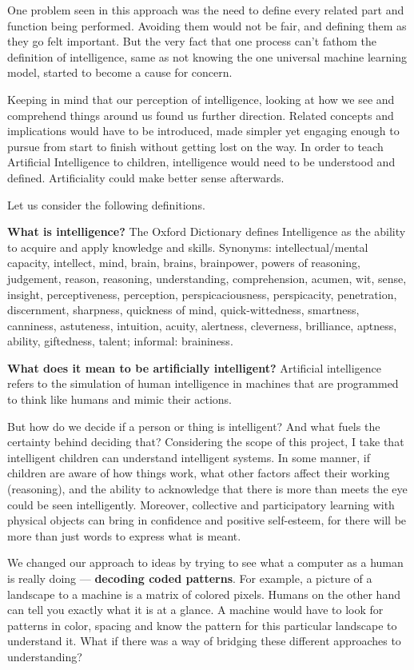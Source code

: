 \documentclass	[a4paper,11pt, hidelinks]{article}
\theoremstyle{definition}
\begin{document}
One problem seen in this approach was the need to define every related part and function being performed.  Avoiding them would not be fair, and defining them as they go felt important. But the very fact that one process can’t fathom the definition of intelligence, same as not knowing the one universal machine learning model, started to become a cause for concern. 

Keeping in mind that our perception of intelligence, looking at how we see and comprehend things around us found us further direction. Related concepts and implications would have to be introduced, made simpler yet engaging enough to pursue from start to finish without getting lost on the way. In order to teach Artificial Intelligence to children, intelligence would need to be understood and defined. Artificiality could make better sense afterwards.

Let us consider the following definitions. 

\textbf{What is intelligence?} The Oxford Dictionary defines Intelligence as the ability to acquire and apply knowledge and skills. Synonyms: intellectual/mental capacity, intellect, mind, brain, brains, brainpower, powers of reasoning, judgement, reason, reasoning, understanding, comprehension, acumen, wit, sense, insight, perceptiveness, perception, perspicaciousness, perspicacity, penetration, discernment, sharpness, quickness of mind, quick-wittedness, smartness, canniness, astuteness, intuition, acuity, alertness, cleverness, brilliance, aptness, ability, giftedness, talent; informal: braininess.

\textbf{What does it mean to be artificially intelligent?} Artificial intelligence refers to the simulation of human intelligence in machines that are programmed to think like humans and mimic their actions. 

But how do we decide if a person or thing is intelligent? And what fuels the certainty behind deciding that? Considering the scope of this project, I take that intelligent children can understand intelligent systems. In some manner, if children are aware of how things work, what other factors affect their working (reasoning), and the ability to acknowledge that there is more than meets the eye could be seen intelligently. Moreover, collective and participatory learning with physical objects can bring in confidence and positive self-esteem, for there will be more than just words to express what is meant.

We changed our approach to ideas by trying to see what a computer as a human is really doing — \textbf{decoding coded patterns}. For example, a picture of a landscape to a machine is a matrix of colored pixels. Humans on the other hand can tell you exactly what it is at a glance. A machine would have to look for patterns in color, spacing and know the pattern for this particular landscape to understand it. What if there was a way of bridging these different approaches to understanding?
\end{document}

